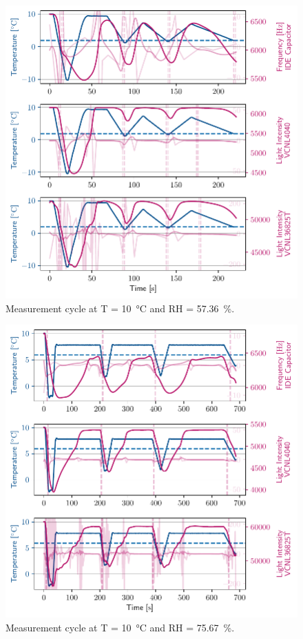 \begin{figure}[ht]
    \centering
    \includegraphics{graphs/t10rh57.4.pdf}
    \caption{Measurement cycle at T = \qty{10}{\celsius} and RH = \qty{57.36}{\percent}.}
    
\end{figure}

\begin{figure}[ht]
    \centering
    \includegraphics{graphs/t10rh75.pdf}
    \caption{Measurement cycle at T = \qty{10}{\celsius} and RH = \qty{75.67}{\percent}.}
    
\end{figure}

